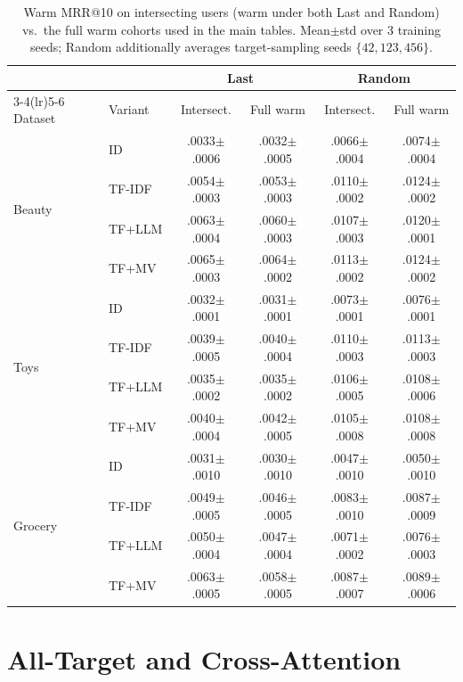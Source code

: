 \documentclass[sigconf,natbib=true,anonymous]{acmart}
\newcommand{\tfidf}{\textsc{TF-IDF}\xspace}
\newcommand{\tfllm}{\textsc{TF+LLM}\xspace}
\newcommand{\tfmv}{\textsc{TF+MV}\xspace}
\begin{document}
\begin{table}[h]
\centering
\caption{Warm MRR@10 on intersecting users (warm under both Last and Random) vs.\ the full warm cohorts used in the main tables. Mean$\pm$std over 3 training seeds; Random additionally averages target-sampling seeds $\{42,123,456\}$.}
\label{tab:intersection}
\small
\setlength{\tabcolsep}{3pt}
\begin{tabular}{@{}llcccc@{}}
\toprule
& & \multicolumn{2}{c}{Last} & \multicolumn{2}{c}{Random} \\
\cmidrule(lr){3-4}\cmidrule(lr){5-6}
Dataset & Variant & Intersect. & Full warm & Intersect. & Full warm \\
\midrule
\multirow{4}{*}{Beauty}
 & ID     & .0033$\pm$.0006 & .0032$\pm$.0005 & .0066$\pm$.0004 & .0074$\pm$.0004 \\
 & \tfidf & .0054$\pm$.0003 & .0053$\pm$.0003 & .0110$\pm$.0002 & .0124$\pm$.0002 \\
 & \tfllm & .0063$\pm$.0004 & .0060$\pm$.0003 & .0107$\pm$.0003 & .0120$\pm$.0001 \\
 & \tfmv  & .0065$\pm$.0003 & .0064$\pm$.0002 & .0113$\pm$.0002 & .0124$\pm$.0002 \\
\midrule
\multirow{4}{*}{Toys}
 & ID     & .0032$\pm$.0001 & .0031$\pm$.0001 & .0073$\pm$.0001 & .0076$\pm$.0001 \\
 & \tfidf & .0039$\pm$.0005 & .0040$\pm$.0004 & .0110$\pm$.0003 & .0113$\pm$.0003 \\
 & \tfllm & .0035$\pm$.0002 & .0035$\pm$.0002 & .0106$\pm$.0005 & .0108$\pm$.0006 \\
 & \tfmv  & .0040$\pm$.0004 & .0042$\pm$.0005 & .0105$\pm$.0008 & .0108$\pm$.0008 \\
\midrule
\multirow{4}{*}{Grocery}
 & ID     & .0031$\pm$.0010 & .0030$\pm$.0010 & .0047$\pm$.0010 & .0050$\pm$.0010 \\
 & \tfidf & .0049$\pm$.0005 & .0046$\pm$.0005 & .0083$\pm$.0010 & .0087$\pm$.0009 \\
 & \tfllm & .0050$\pm$.0004 & .0047$\pm$.0004 & .0071$\pm$.0002 & .0076$\pm$.0003 \\
 & \tfmv  & .0063$\pm$.0005 & .0058$\pm$.0005 & .0087$\pm$.0007 & .0089$\pm$.0006 \\
\bottomrule
\end{tabular}
\end{table}

\section{All-Target and Cross-Attention}
\label{app:alltarget}
\end{document}
